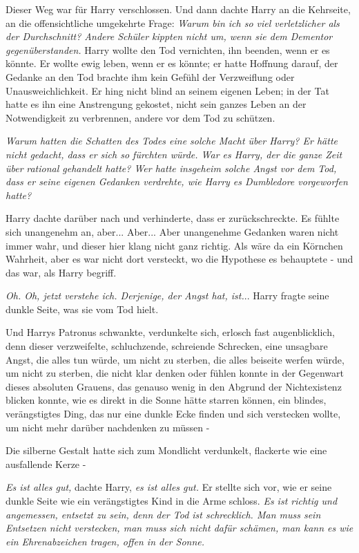 Dieser Weg war für Harry verschlossen. Und dann dachte Harry an die Kehrseite,
an die offensichtliche umgekehrte Frage: \emph{Warum bin ich so viel
verletzlicher als der Durchschnitt? Andere Schüler kippten nicht um, wenn sie
dem Dementor gegenüberstanden.} Harry wollte den Tod vernichten, ihn beenden,
wenn er es könnte. Er wollte ewig leben, wenn er es könnte; er hatte Hoffnung
darauf, der Gedanke an den Tod brachte ihm kein Gefühl der Verzweiflung oder
Unausweichlichkeit. Er hing nicht blind an seinem eigenen Leben; in der Tat
hatte es ihn eine Anstrengung gekostet, nicht sein ganzes Leben an der
Notwendigkeit zu verbrennen, andere vor dem Tod zu schützen.

\emph{Warum hatten die Schatten des Todes eine solche Macht über Harry? Er hätte
nicht gedacht, dass er sich so fürchten würde. War es Harry, der die ganze Zeit
über} \emph{rational gehandelt hatte? Wer hatte insgeheim solche Angst vor dem
Tod, dass er seine eigenen Gedanken verdrehte, wie Harry es Dumbledore
vorgeworfen hatte?}

Harry dachte darüber nach und verhinderte, dass er zurückschreckte. Es fühlte
sich unangenehm an, aber... Aber... Aber unangenehme Gedanken waren nicht immer
wahr, und dieser hier klang nicht ganz richtig. Als wäre da ein Körnchen
Wahrheit, aber es war nicht dort versteckt, wo die Hypothese es behauptete - und
das war, als Harry begriff.

\emph{Oh. Oh, jetzt verstehe ich. Derjenige, der Angst hat, ist.}.. Harry fragte
seine dunkle Seite, was sie vom Tod hielt.

Und Harrys Patronus schwankte, verdunkelte sich, erlosch fast augenblicklich,
denn dieser verzweifelte, schluchzende, schreiende Schrecken, eine unsagbare
Angst, die alles tun würde, um nicht zu sterben, die alles beiseite werfen
würde, um nicht zu sterben, die nicht klar denken oder fühlen konnte in der
Gegenwart dieses absoluten Grauens, das genauso wenig in den Abgrund der
Nichtexistenz blicken konnte, wie es direkt in die Sonne hätte starren können,
ein blindes, verängstigtes Ding, das nur eine dunkle Ecke finden und sich
verstecken wollte, um nicht mehr darüber nachdenken zu müssen -

Die silberne Gestalt hatte sich zum Mondlicht verdunkelt, flackerte wie eine
ausfallende Kerze -

\emph{Es ist alles gut,} dachte Harry,\emph{ es ist alles gut.} Er stellte sich
vor, wie er seine dunkle Seite wie ein verängstigtes Kind in die Arme schloss.
\emph{Es ist richtig und angemessen, entsetzt zu sein, denn der Tod ist
schrecklich. Man muss sein Entsetzen nicht verstecken, man muss sich nicht dafür
schämen, man kann es wie ein Ehrenabzeichen tragen, offen in der Sonne.}

